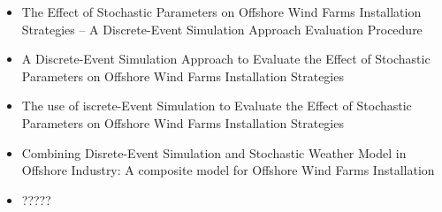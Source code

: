 \begin{titles}
\begin{itemize}
\item The Effect of Stochastic Parameters on Offshore Wind Farms Installation Strategies -- A Discrete-Event Simulation Approach Evaluation Procedure
\item A Discrete-Event Simulation Approach to Evaluate the Effect of Stochastic Parameters on Offshore Wind Farms Installation Strategies
\item The use of iscrete-Event Simulation to Evaluate the Effect of Stochastic Parameters on Offshore Wind Farms Installation Strategies
\item Combining Disrete-Event Simulation and Stochastic Weather Model in Offshore Industry: A composite model for Offshore Wind Farms Installation
\item ?????
\end{itemize}
\end{titles}